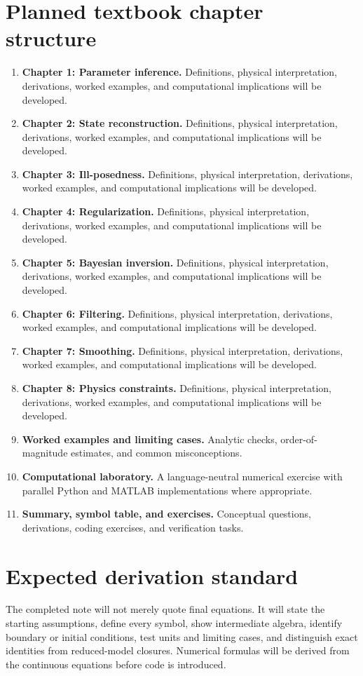 \documentclass[11pt]{article}
\begin{document}
\section{Planned textbook chapter structure}
\begin{enumerate}[leftmargin=1.8em]
\item \textbf{Chapter 1: Parameter inference.} Definitions, physical interpretation, derivations, worked examples, and computational implications will be developed.
\item \textbf{Chapter 2: State reconstruction.} Definitions, physical interpretation, derivations, worked examples, and computational implications will be developed.
\item \textbf{Chapter 3: Ill-posedness.} Definitions, physical interpretation, derivations, worked examples, and computational implications will be developed.
\item \textbf{Chapter 4: Regularization.} Definitions, physical interpretation, derivations, worked examples, and computational implications will be developed.
\item \textbf{Chapter 5: Bayesian inversion.} Definitions, physical interpretation, derivations, worked examples, and computational implications will be developed.
\item \textbf{Chapter 6: Filtering.} Definitions, physical interpretation, derivations, worked examples, and computational implications will be developed.
\item \textbf{Chapter 7: Smoothing.} Definitions, physical interpretation, derivations, worked examples, and computational implications will be developed.
\item \textbf{Chapter 8: Physics constraints.} Definitions, physical interpretation, derivations, worked examples, and computational implications will be developed.
\item \textbf{Worked examples and limiting cases.} Analytic checks, order-of-magnitude estimates, and common misconceptions.
\item \textbf{Computational laboratory.} A language-neutral numerical exercise with parallel Python and MATLAB implementations where appropriate.
\item \textbf{Summary, symbol table, and exercises.} Conceptual questions, derivations, coding exercises, and verification tasks.
\end{enumerate}

\section{Expected derivation standard}
The completed note will not merely quote final equations. It will state the starting assumptions, define every symbol, show intermediate algebra, identify boundary or initial conditions, test units and limiting cases, and distinguish exact identities from reduced-model closures. Numerical formulas will be derived from the continuous equations before code is introduced.
\end{document}
